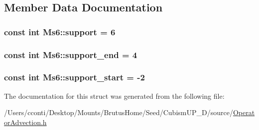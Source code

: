 \subsection{Member Data Documentation}
\hypertarget{struct_ms6_ac772f8b51bb556169f9465af9adb2ae8}{}
\subsubsection[{support}]{\setlength{\rightskip}{0pt plus 5cm}const int Ms6\+::support = 6\hspace{0.3cm}{\ttfamily [static]}}\label{struct_ms6_ac772f8b51bb556169f9465af9adb2ae8}
\hypertarget{struct_ms6_ae435e121585184ae5a790dd535741697}{}
\subsubsection[{support\+\_\+end}]{\setlength{\rightskip}{0pt plus 5cm}const int Ms6\+::support\+\_\+end = 4\hspace{0.3cm}{\ttfamily [static]}}\label{struct_ms6_ae435e121585184ae5a790dd535741697}
\hypertarget{struct_ms6_a51396c124a733a80c6ed4248191c3f67}{}
\subsubsection[{support\+\_\+start}]{\setlength{\rightskip}{0pt plus 5cm}const int Ms6\+::support\+\_\+start = -\/2\hspace{0.3cm}{\ttfamily [static]}}\label{struct_ms6_a51396c124a733a80c6ed4248191c3f67}


The documentation for this struct was generated from the following file\+:\begin{DoxyCompactItemize}
\item 
/\+Users/cconti/\+Desktop/\+Mounts/\+Brutus\+Home/\+Seed/\+Cubism\+U\+P\+\_\+D/source/\hyperlink{_operator_advection_8h}{Operator\+Advection.\+h}\end{DoxyCompactItemize}
